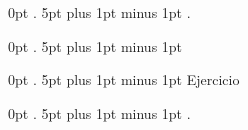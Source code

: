 \usepackage{colortbl}



\usepackage[unicode,colorlinks=true,linkcolor=mylinkcolor,citecolor=mycitecolor]{hyperref}
\newcommand{\refref}[2]{\hyperref[#2]{#1~\ref*{#2}}}
\newcommand{\eqnref}[1]{\hyperref[#1]{(\ref*{#1})}}

\newcommand{\tos}{\!\!\to\!\!}

\usepackage{framed}

\newcommand{\cequiv}{\simeq}

\makeatletter
\newcommand\xleftrightarrow[2][]{%
  \ext@arrow 9999{\longleftrightarrowfill@}{#1}{#2}}
\newcommand\longleftrightarrowfill@{%
  \arrowfill@\leftarrow\relbar\rightarrow}
\makeatother

\newcommand{\bsquare}{\textrm{\ding{114}}}


  {\topsep}   %
  {\topsep}   %
  {\itshape}  %
  {0pt}       %
  {\bfseries} %
  {.}         %
  {5pt plus 1pt minus 1pt} %
  {. }   %

  {\topsep}   %
  {\topsep}   %
  {\normalfont}  %
  {0pt}       %
  {\bfseries} %
  {.}         %
  {5pt plus 1pt minus 1pt} %
  {}   %

  {\topsep}   %
  {\topsep}   %
  {\normalfont}  %
  {0pt}       %
  {\bfseries} %
  {.}         %
  {5pt plus 1pt minus 1pt} %
  {Ejercicio }   %

  {\topsep}   %
  {\topsep}   %
  {\normalfont}  %
  {0pt}       %
  {\bfseries} %
  {.}         %
  {5pt plus 1pt minus 1pt} %
  {. }   %

